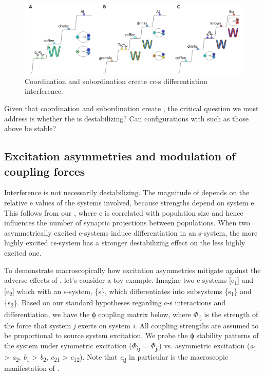  
\begin{figure}
\includegraphics[width=\textwidth]{figures/Tilsen-img94.png}
\caption{Coordination and subordination create cc-s differentiation interference.}
\label{fig:4:44}
\end{figure}
 

  Given that coordination and subordination create , the critical question we must address is whether the  is destabilizing? Can configurations with  such as those above be stable? 

\subsection{Excitation asymmetries and modulation of coupling forces}

Interference is not necessarily destabilizing. The magnitude of  depends on the relative e values of the systems involved, because  strengths depend on system e. This follows from our , where e is correlated with population size and hence influences the number of synaptic projections between populations. When two asymmetrically excited c-systems induce differentiation  in an s-system, the more highly excited cs-system has a stronger destabilizing effect on the less highly excited one.

  To demonstrate macroscopically how excitation asymmetries mitigate against the adverse effects of , let's consider a toy example. Imagine two c-systems [c\textsubscript{1}] and [c\textsubscript{2}] which  with an s-system, \{s\}, which differentiates into subsystems \{s\textsubscript{1}\} and \{s\textsubscript{2}\}. Based on our standard hypotheses regarding c-s interactions and differentiation, we have the ϕ coupling matrix below, where $\Phi$\textsubscript{ij} is the strength of the force that system \textit{j} exerts on system \textit{i}. All coupling strengths are assumed to be proportional to source system excitation. We probe the ϕ stability patterns of the system under symmetric excitation ($\Phi$\textsubscript{ij} = $\Phi$\textsubscript{ji}) vs. asymmetric excitation (\textit{a}\textsubscript{1} > \textit{a}\textsubscript{2}, \textit{b}\textsubscript{1} > \textit{b}\textsubscript{2}, \textit{c}\textsubscript{21} > \textit{c}\textsubscript{12}). Note that \textit{c}\textsubscript{ij} in particular is the macroscopic manifestation of  .

